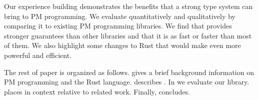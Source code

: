 Our experience building \this{} demonstrates the benefits that a strong type
system can bring to PM programming.  We evaluate \this{} quantitatively and
qualitatively by comparing it to existing PM programming libraries.  We find
that \this{} provides stronger guarantees than other libraries and that it is
as fast or faster than most of them.  We also highlight some changes
to Rust that would make \this{} even more powerful and efficient.

The rest of paper is organized as follows.  gives a brief
background information on PM programming and the Rust language.
 describes \this{}.  In 
we evaluate our library.  places \this{} in context relative to related work.
 Finally,  concludes.





